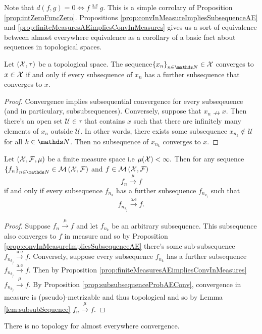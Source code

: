 Note that $d(f,g)=0\Longleftrightarrow f\stackrel{\text{a.e}}{=}g$.
This is a simple corrolary of Proposition \ref{prop:intZeroFuncZero}.
Propositions \ref{prop:convInMeasureImpliesSubsequenceAE} and \ref{prop:finiteMeasuresAEimpliesConvInMeasures}
gives us a sort of equivalence between almost everywhere equivalence
as a corollary of a basic fact about sequences in topological spaces.
\begin{lem}
\label{lem:subsubSequence}Let $\left(\mathcal{X},\tau\right)$ be a topological
space. The sequence$\left\{ x_{n}\right\} _{n\in\N}\in\X$ converges
to $x\in\mathcal{X}$ if and only if every subsequence of $x_{n}$ has a further
subsequence that converges to $x.$
\end{lem}

\begin{proof}
Convergence implies subsequential convergence for every subseqeuence
(and in particulary, subsubsequences). Conversely, suppose that $x_{n}\nrightarrow x$.
Then there's an open set $\mathcal{U\in\tau}$ that contains $x$
such that there are infinitely many elements of $x_{n}$ outside $\mathcal{U}$.
In other words, there exists some subsequence $x_{n_{k}}\notin\mathcal{U}$
for all $k\in\N$. Then no subsequence of $x_{n_{k}}$ converges to
$x$.
\end{proof}
\begin{prop}
\label{prop:subsubsequenceProbAEConv}Let $\left(\mathcal{X},\mathcal{F},\mu\right)$
be a finite measure space i.e $\mu(\mathcal{X})<\infty.$ Then for any sequence
$\left\{ f_{n}\right\} _{n\in\N}\in\measurableFunctions$ and $f\in\mathcal{M}\left(\mathcal{X},\mathcal{F}\right)$
\[
f_{n}\stackrel{\mu}{\longrightarrow}f
\]
if and only if every subsequence $f_{n_{k}}$ has a further subsequence
$f_{n_{k_{j}}}$ such that 
\[
f_{n_{k_{j}}}\stackrel{\text{a.e}}{\longrightarrow}f.
\]
\end{prop}

\begin{proof}
Suppose $f_{n}\stackrel{\mu}{\longrightarrow}f$ and let $f_{n_{k}}$
be an arbitrary subsequence. This subsequence also converges to $f$
in measure and so by Proposition \ref{prop:convInMeasureImpliesSubsequenceAE}
there's some sub-subsequence $f_{n_{k_{j}}}\stackrel{\text{a.e}}{\longrightarrow}f$.
Conversely, suppose every subsequence $f_{n_{k}}$ has a further subsequence
$f_{n_{k_{j}}}\stackrel{\text{a.e}}{\longrightarrow}f$. Then by Proposition
\ref{prop:finiteMeasuresAEimpliesConvInMeasures} $f_{n_{k_{j}}}\stackrel{\mu}{\longrightarrow}f$.
By Proposition \ref{prop:subsubsequenceProbAEConv}, convergence in
measure is (pseudo)-metrizable and thus topological and so by Lemma
\ref{lem:subsubSequence} $f_{n}\stackrel{\mu}{\longrightarrow}f.$
\end{proof}
\begin{cor}
\label{cor:noTopologyForAEConv}There is no topology for almost everywhere
convergence.
\end{cor}

